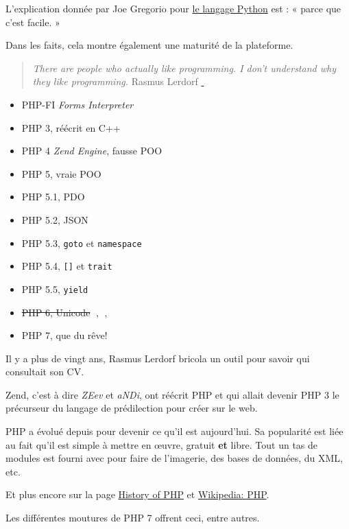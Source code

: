 L'explication donnée par Joe Gregorio pour
\href{http://bitworking.org/news/Why_so_many_Python_web_frameworks}{le
langage Python} est : « parce que c'est facile. »

Dans les faits, cela montre également une maturité de la plateforme.

\begin{quote}
\emph{There are people who actually like programming. I don't understand
why they like programming.} Rasmus Lerdorf
\href{https://en.wikiquote.org/wiki/Rasmus_Lerdorf}{💬}
\end{quote}

\begin{itemize}
\tightlist
\item
  PHP-FI \emph{Forms Interpreter}
\item
  PHP 3, réécrit en C++
\item
  PHP 4 \emph{Zend Engine}, fausse POO
\item
  PHP 5, vraie POO
\item
  PHP 5.1, PDO
\item
  PHP 5.2, JSON
\item
  PHP 5.3, \textenglish{\texttt{goto}} et
  \textenglish{\texttt{namespace}}
\item
  PHP 5.4, \textenglish{\texttt{{[}{]}}} et \textenglish{\texttt{trait}}
\item
  PHP 5.5, \textenglish{\texttt{yield}}
\item
  \sout{PHP 6, Unicode} 💩, 🎃, 🐧
\item
  PHP 7, que du rêve!
\end{itemize}

Il y a plus de vingt ans, Rasmus Lerdorf bricola un outil pour savoir
qui consultait son CV.

Zend, c'est à dire \emph{ZEev} et \emph{aNDi}, ont réécrit PHP et qui
allait devenir PHP 3 le précurseur du langage de prédilection pour créer
sur le web.

PHP a évolué depuis pour devenir ce qu'il est aujourd'hui. Sa popularité
est liée au fait qu'il est simple à mettre en œuvre, gratuit \textbf{et}
libre. Tout un tas de modules est fourni avec pour faire de l'imagerie,
des bases de données, du XML, etc.

Et plus encore sur la page
\href{http://php.net/manual/en/history.php.php}{History of PHP} et
\href{https://en.wikipedia.org/wiki/PHP}{Wikipedia: PHP}.

Les différentes moutures de PHP 7 offrent ceci, entre autres.


